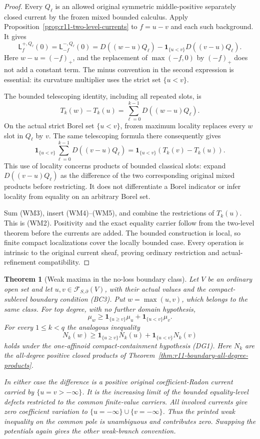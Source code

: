 \documentclass[11pt,a4paper]{article}
\numberwithin{equation}{section}
\newtheorem{theorem}{Theorem}[section]
\theoremstyle{definition}
\theoremstyle{remark}
\begin{document}
\begin{proof}
Every $Q_\ell$ is an allowed original symmetric middle-positive
separately closed current by the frozen mixed bounded calculus.
Apply Proposition~\ref{prop:r11-two-level-currents} to $f=u-v$
and each such background. It gives
\[
 \mathsf L_{f}^{+,Q_\ell}(0)
     =\mathsf L_{-f}^{-,Q_\ell}(0)
     =D((w-u)Q_\ell)
                    -\mathbf1_{\{u<v\}}D((v-u)Q_\ell).
 \tag{WM3}
\]
Here $w-u=(-f)_+$, and the replacement of $\max(-f,0)$ by
$(-f)_+$ does not add a constant term. The minus convention
in the second expression is essential: its curvature multiplier
uses the strict set $\{u<v\}$.

The bounded telescoping identity, including all repeated slots,
is
\[
       T_k(w)-T_k(u)
          =\sum_{\ell=0}^{k-1}D((w-u)Q_\ell).
 \tag{WM4}
\]
On the actual strict Borel set $\{u<v\}$, frozen maximum
locality replaces every $w$ slot in $Q_\ell$ by $v$. The
same telescoping formula there consequently gives
\[
 \mathbf1_{\{u<v\}}
       \sum_{\ell=0}^{k-1}D((v-u)Q_\ell)
      =\mathbf1_{\{u<v\}}(T_k(v)-T_k(u)).
 \tag{WM5}
\]
This use of locality concerns products of bounded classical
slots: expand $D((v-u)Q_\ell)$ as the difference of the two
corresponding original mixed products before restricting.
It does not differentiate a Borel indicator or infer locality
from equality on an arbitrary Borel set.

Sum (WM3), insert (WM4)--(WM5), and combine the restrictions
of $T_k(u)$. This is (WM2). Positivity and the exact equality
carrier follow from the two-level theorem before the currents
are added. The bounded construction is local, so finite compact
localizations cover the locally bounded case. Every operation
is intrinsic to the original current sheaf, proving ordinary
restriction and actual-refinement compatibility.
\end{proof}

\begin{theorem}[Weak maxima in the no-loss boundary class]
\label{thm:r11-unbounded-weak-maximum}
Let $V$ be an ordinary open set and let
$u,v\in\mathcal F_{S,\partial}(V)$, with their actual values
and the compact-sublevel boundary condition (BC3). Put
$w=\max(u,v)$, which belongs to the same class.
For top degree, with no further domain hypothesis,
\[
 \mu_w\geq\mathbf1_{\{u\geq v\}}\mu_u
                        +\mathbf1_{\{u<v\}}\mu_v.
 \tag{WM6}
\]
For every $1\leq k<q$ the analogous inequality
\[
 N_k(w)\geq\mathbf1_{\{u\geq v\}}N_k(u)
                        +\mathbf1_{\{u<v\}}N_k(v)
 \tag{WM7}
\]
holds under the one-affinoid compact-containment hypothesis (DG1).
Here $N_k$ are the all-degree positive closed products of
Theorem~\ref{thm:r11-boundary-all-degree-products}.

In either case the difference is a positive original
coefficient-Radon current carried by
$\{u=v> -\infty\}$. It is the increasing limit of the
bounded equality-level defects restricted to the common
finite-value carriers. All involved currents give zero
coefficient variation to $\{u=-\infty\}\cup\{v=-\infty\}$.
Thus the printed weak inequality on the common pole is
unambiguous and contributes zero. Swapping the potentials
again gives the other weak-branch convention.
\end{theorem}
\end{document}

